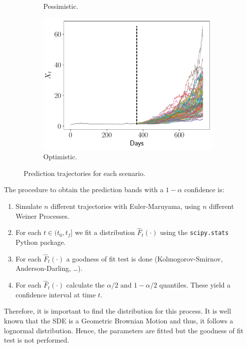 \documentclass[11pt]{article}
\theoremstyle{definition}
\theoremstyle{remark}
\theoremstyle{remark}
\begin{document}
\begin{figure}
\begin{subfigure}[b]{0.45\textwidth}
      \caption{Pessimistic.}
  \end{subfigure}
  \begin{subfigure}[b]{0.45\textwidth}
      \centering
      \includegraphics[scale=0.45]{pronostico-optimista.pdf}
      \caption{Optimistic.}
  \end{subfigure}
  \caption{Prediction trajectories for each scenario.}
  \label{fig:trajectories1}
\end{figure}

The procedure to obtain the prediction bands with a $1 - \alpha$
confidence is:
\begin{enumerate}
\item Simulate $n$ different trajectories with Euler-Maruyama, using
  $n$ different Weiner Processes.
\item For each $t \in (t_0, t_f]$ we fit a distribution
  $\hat{F}_t(\cdot)$ using the \texttt{scipy.stats} Python package.
\item For each $\hat{F}_t(\cdot)$ a goodness of fit test is done
  (Kolmogorov-Smirnov, Anderson-Darling, \dots).
\item For each $\hat{F}_t(\cdot)$ calculate the $\alpha / 2$ and
  $1 - \alpha/2$ quantiles. These yield a confidence interval at
  time $t$.
\end{enumerate}

Therefore, it is important to find the distribution for this
process. It is well known that the SDE is a Geometric Brownian Motion
and thus, it follows a lognormal distribution. Hence, the parameters
are fitted but the goodness of fit test is not performed.
\end{document}
